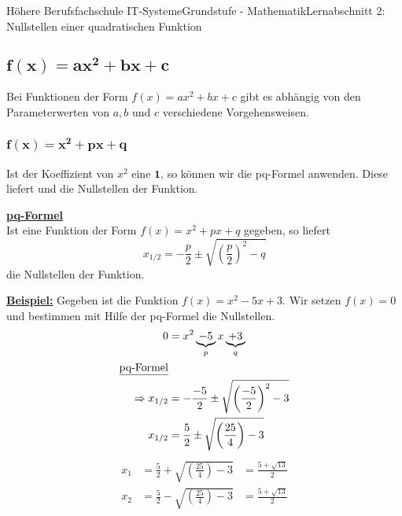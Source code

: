 \documentclass[11pt,twocolumn,oneside,openany,headings=optiontotoc,11pt,numbers=noenddot]{article}
\begin{document}
\begin{worksheet}{Höhere Berufsfachschule IT-Systeme}{Grundstufe - Mathematik}{Lernabschnitt 2: Nullstellen einer quadratischen Funktion}
		\subsection{\(\mathbf{f(x) = ax^2 + bx + c}\)}
		Bei Funktionen der Form \(f(x) = ax^2 + bx +c\) gibt es abhängig von den Parameterwerten von \(a, b\) und \(c\) verschiedene Vorgehensweisen.\\
		\subsubsection*{\(\mathbf{f(x) = x^2 + px + q}\)}
		Ist der Koeffizient von \(x^2\) eine \(\mathbf{1}\), so können wir die pq-Formel anwenden. Diese liefert und die Nullstellen der Funktion.
		\begin{framed}
			\noindent
			\underline{\textbf{pq-Formel}}\\
			Ist eine Funktion der Form \(f(x) = x^2 + px + q\) gegeben, so liefert \[x_{1/2} = -\frac{p}{2}\pm \sqrt{\left(\frac{p}{2}\right)^2 - q}\] die Nullstellen der Funktion.
		\end{framed}
		\noindent
		\underline{\textbf{Beispiel:}} Gegeben ist die Funktion \(f(x) = x^2 -5x + 3\). Wir setzen \(f(x) = 0\) und bestimmen mit Hilfe der pq-Formel die Nullstellen.
		\begin{align*}
			0 & = x^2 \underbrace{- 5}_{p}x \underbrace{+ 3}_{q}\\
			\text{\underline{pq-Formel}}\\
			\Rightarrow x_{1/2} & = -\frac{-5}{2} \pm \sqrt{\left(\frac{-5}{2}\right)^2 - 3}\\
			x_{1/2} & = \frac{5}{2} \pm \sqrt{\left(\frac{25}{4}\right) - 3}\\
		\end{align*}
		\begin{align*}
			x_1 & = \frac{5}{2} + \sqrt{\left(\frac{25}{4}\right) - 3} & = \frac{5 +\sqrt{13}}{2}\\
			x_2 & = \frac{5}{2} - \sqrt{\left(\frac{25}{4}\right) - 3} & = \frac{5 +\sqrt{13}}{2}\\\\
		\end{align*}

\end{worksheet}
\end{document}
